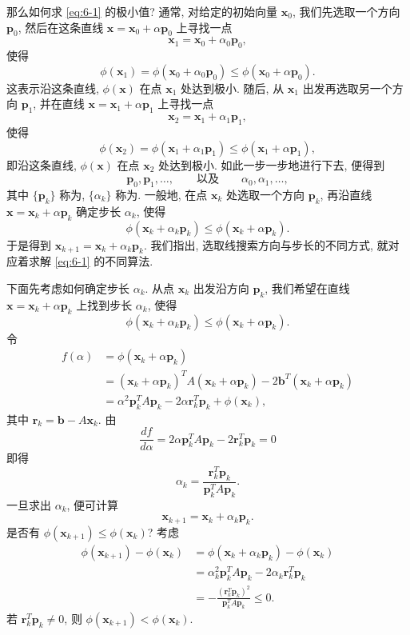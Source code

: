 那么如何求 \eqref{eq:6-1} 的极小值? 通常, 对给定的初始向量 $\mathbf{x}_0$, 我们先选取一个方向 $\mathbf{p}_0$, 然后在这条直线 $\mathbf{x}=\mathbf{x}_0+\alpha\mathbf{p}_0$ 上寻找一点
\[
  \mathbf{x}_1=\mathbf{x}_0+\alpha_0\mathbf{p}_0,
\]
使得
\[
  \phi(\mathbf{x}_1)=\phi(\mathbf{x}_0+\alpha_0\mathbf{p}_0)
  \leqslant\phi(\mathbf{x}_0+\alpha\mathbf{p}_0).
\]
这表示沿这条直线, $\phi(\mathbf{x})$ 在点 $\mathbf{x}_1$ 处达到极小. 随后, 从 $\mathbf{x}_1$ 出发再选取另一个方向 $\mathbf{p}_1$, 并在直线 $\mathbf{x}=\mathbf{x}_1+\alpha\mathbf{p}_1$ 上寻找一点
\[
  \mathbf{x}_2=\mathbf{x}_1+\alpha_1\mathbf{p}_1,
\]
使得
\[
  \phi(\mathbf{x}_2)=\phi(\mathbf{x}_1+\alpha_1\mathbf{p}_1)
  \leqslant\phi(\mathbf{x}_1+\alpha\mathbf{p}_1),
\]
即沿这条直线, $\phi(\mathbf{x})$ 在点 $\mathbf{x}_2$ 处达到极小. 如此一步一步地进行下去, 便得到
\[
  \mathbf{p}_0,\mathbf{p}_1,\ldots,
  \qquad\text{以及}\qquad
  \alpha_0,\alpha_1,\ldots,
\]
其中 $\{\mathbf{p}_k\}$ 称为, $\{\alpha_k\}$ 称为. 一般地, 在点 $\mathbf{x}_k$ 处选取一个方向 $\mathbf{p}_k$, 再沿直线 $\mathbf{x}=\mathbf{x}_k+\alpha\mathbf{p}_k$ 确定步长 $\alpha_k$, 使得
\[
  \phi(\mathbf{x}_k+\alpha_k\mathbf{p}_k)
  \leqslant\phi(\mathbf{x}_k+\alpha\mathbf{p}_k).
\]
于是得到 $\mathbf{x}_{k+1}=\mathbf{x}_k+\alpha_k\mathbf{p}_k$. 我们指出, 选取线搜索方向与步长的不同方式, 就对应着求解 \eqref{eq:6-1} 的不同算法.

下面先考虑如何确定步长 $\alpha_k$. 从点 $\mathbf{x}_k$ 出发沿方向 $\mathbf{p}_k$, 我们希望在直线 $\mathbf{x}=\mathbf{x}_k+\alpha\mathbf{p}_k$ 上找到步长 $\alpha_k$, 使得
\[
  \phi(\mathbf{x}_k+\alpha_k\mathbf{p}_k)
  \leqslant\phi(\mathbf{x}_k+\alpha\mathbf{p}_k).
\]
令
\[
  \begin{aligned}
    f(\alpha)&=\phi(\mathbf{x}_k+\alpha\mathbf{p}_k)\\
    &=(\mathbf{x}_k+\alpha\mathbf{p}_k)^TA(\mathbf{x}_k+\alpha\mathbf{p}_k)
      -2\mathbf{b}^T(\mathbf{x}_k+\alpha\mathbf{p}_k)\\
    &=\alpha^2\mathbf{p}_k^TA\mathbf{p}_k-2\alpha\mathbf{r}_k^T\mathbf{p}_k
      +\phi(\mathbf{x}_k),
  \end{aligned}
\]
其中 $\mathbf{r}_k=\mathbf{b}-A\mathbf{x}_k$. 由
\[
  \frac{df}{d\alpha}=2\alpha\mathbf{p}_k^TA\mathbf{p}_k-2\mathbf{r}_k^T\mathbf{p}_k=0
\]
即得
\begin{equation}
  \alpha_k=\frac{\mathbf{r}_k^T\mathbf{p}_k}{\mathbf{p}_k^TA\mathbf{p}_k}.
  \label{eq:6-3}
\end{equation}
一旦求出 $\alpha_k$, 便可计算
\[
  \mathbf{x}_{k+1}=\mathbf{x}_k+\alpha_k\mathbf{p}_k.
\]
是否有 $\phi(\mathbf{x}_{k+1})\leqslant\phi(\mathbf{x}_k)$? 考虑
\[
  \begin{aligned}
    \phi(\mathbf{x}_{k+1})-\phi(\mathbf{x}_k)
    &=\phi(\mathbf{x}_k+\alpha_k\mathbf{p}_k)-\phi(\mathbf{x}_k)\\
    &=\alpha_k^2\mathbf{p}_k^TA\mathbf{p}_k-2\alpha_k\mathbf{r}_k^T\mathbf{p}_k\\
    &=-\frac{(\mathbf{r}_k^T\mathbf{p}_k)^2}{\mathbf{p}_k^TA\mathbf{p}_k}\leqslant0.
  \end{aligned}
\]
若 $\mathbf{r}_k^T\mathbf{p}_k\neq0$, 则 $\phi(\mathbf{x}_{k+1})<\phi(\mathbf{x}_k)$.

